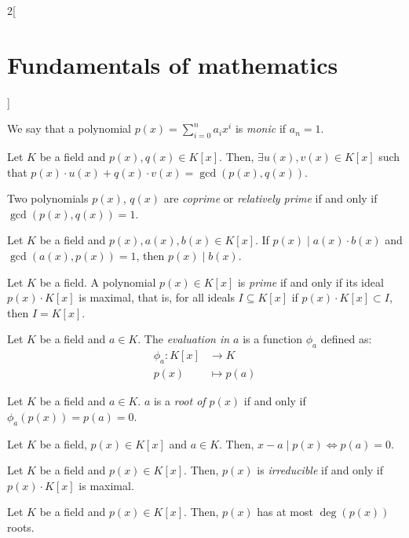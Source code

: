 \documentclass[../../../main.tex]{subfiles}
\begin{document}
\begin{multicols}{2}[\section{Fundamentals of mathematics}]
\begin{definition}
    We say that a polynomial $p(x)=\sum_{i=0}^na_ix^i$ is \textit{monic} if $a_n=1$.
\end{definition}
\begin{theorem}
    Let $K$ be a field and $p(x),q(x)\in K[x]$. Then, $\exists u(x), v(x)\in K[x]$ such that $p(x)\cdot u(x)+q(x)\cdot v(x)=\gcd(p(x),q(x))$.
\end{theorem}
\begin{definition}
    Two polynomials $p(x)$, $q(x)$ are \textit{coprime} or \textit{relatively prime} if and only if $\gcd(p(x),q(x))=1$.
\end{definition}
\begin{theorem}
    Let $K$ be a field and $p(x),a(x),b(x)\in K[x]$. If $p(x)\mid a(x)\cdot b(x)$ and $\gcd(a(x),p(x))=1$, then $p(x)\mid b(x)$.
\end{theorem}
\begin{definition}
    Let $K$ be a field. A polynomial $p(x)\in K[x]$ is \textit{prime} if and only if its ideal $p(x)\cdot K[x]$ is maximal, that is, for all ideals $I\subseteq K[x]$ if $p(x)\cdot K[x] \subset I$, then $I=K[x]$.
\end{definition}
\begin{definition}
    Let $K$ be a field and $a\in K$. The \textit{evaluation in $a$} is a function $\phi_a$ defined as:
    \begin{align*}
        \phi_a:K[x]&\longrightarrow K\\
        p(x)&\longmapsto p(a)
    \end{align*}
\end{definition}
\begin{definition}
    Let $K$ be a field and $a\in K$. $a$ is a \textit{root of $p(x)$} if and only if $\phi_a(p(x))=p(a)=0$.
\end{definition}
\begin{theorem}
    Let $K$ be a field, $p(x)\in K[x]$ and $a\in K$. Then, $x-a\mid p(x)\iff p(a)=0$.
\end{theorem}
\begin{definition}
    Let $K$ be a field and $p(x)\in K[x]$. Then, $p(x)$ is \textit{irreducible} if and only if $p(x)\cdot K[x]$ is maximal.
\end{definition}
\begin{theorem}
    Let $K$ be a field and $p(x)\in K[x]$. Then, $p(x)$ has at most $\deg(p(x))$ roots.
\end{theorem}

\end{multicols}
\end{document}

